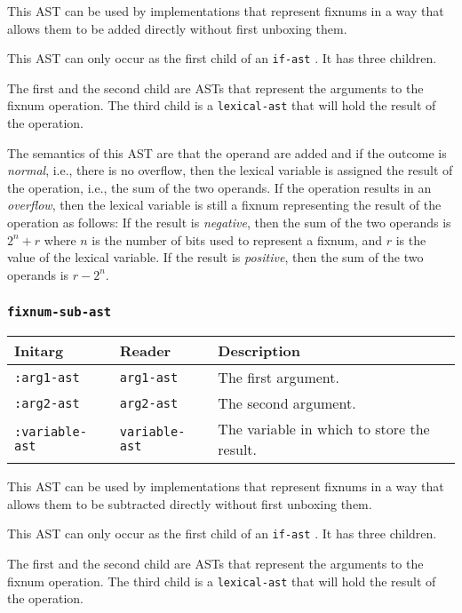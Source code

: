 This AST can be used by implementations that represent fixnums in a
way that allows them to be added directly without first unboxing
them.

This AST can only occur as the first child of an \texttt{if-ast}
.  It has three children.

The first and the second child are ASTs that represent the arguments
to the fixnum operation.  The third child is a
\texttt{lexical-ast} that will hold the result of the operation.

The semantics of this AST are that the operand are added and if the
outcome is \emph{normal}, i.e., there is no overflow, then the lexical
variable is assigned the result of the operation, i.e., the sum of the
two operands.  If the operation results in an \emph{overflow}, then
the lexical variable is still a fixnum representing the result of the
operation as follows:  If the result is \emph{negative}, then the
sum of the two operands is $2^n + r$ where $n$ is the number of bits
used to represent a fixnum, and $r$ is the value of the lexical
variable.  If the result is \emph{positive}, then the sum of the two
operands is $r - 2^n$.

\subsubsection{\texttt{fixnum-sub-ast}}
\label{fixnum-sub-ast}

\begin{tabular}{|l|l|l|}
\hline
Initarg & Reader & Description\\
\hline\hline
\texttt{:arg1-ast} & \texttt{arg1-ast} & The first argument.\\
\hline
\texttt{:arg2-ast} & \texttt{arg2-ast} & The second argument.\\
\hline
\texttt{:variable-ast} & \texttt{variable-ast} & The variable in which to store the result.\\
\hline
\end{tabular}

This AST can be used by implementations that represent fixnums in a
way that allows them to be subtracted directly without first unboxing
them.

This AST can only occur as the first child of an \texttt{if-ast}
.  It has three children.

The first and the second child are ASTs that represent the arguments
to the fixnum operation.  The third child is a
\texttt{lexical-ast} that will hold the result of the operation.

